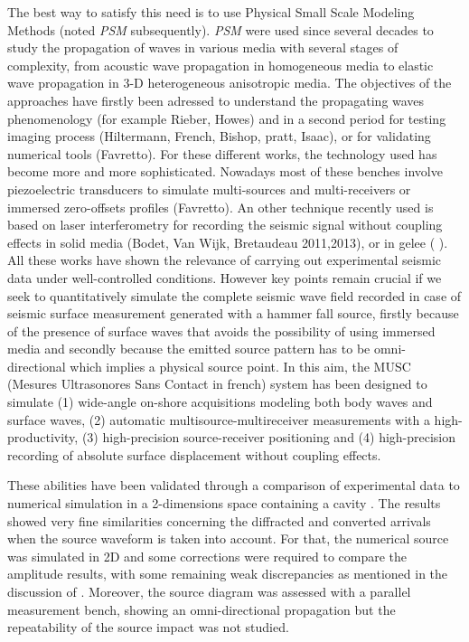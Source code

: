 \documentclass[manuscript,revised]{geophysics}
\newcommand{\psm}{\textit{PSM} }
\newcommand{\thrd}{3-D }
\begin{document}
\noindent The best way to satisfy this need is to use Physical Small Scale Modeling Methods (noted \psm subsequently). \psm were used since several decades to study the propagation of waves in various media with several stages of complexity, from acoustic wave propagation in homogeneous media to elastic wave propagation in \thrd heterogeneous anisotropic media. The objectives of the approaches have firstly been adressed to understand the propagating waves phenomenology (for example  Rieber, Howes) and in a second period for testing imaging process (Hiltermann, French, Bishop, pratt, Isaac), or for validating numerical tools (Favretto). For these different works, the technology used has become more and more sophisticated. Nowadays most of these benches involve piezoelectric transducers to simulate multi-sources and multi-receivers \citep{Wong_SPM_2009} or immersed zero-offsets profiles (Favretto). An other technique recently used is based on laser interferometry for recording the seismic signal without coupling effects in solid media (Bodet, Van Wijk, Bretaudeau 2011,2013), or in gelee ( ). All these works have shown the relevance of carrying out experimental seismic data under well-controlled conditions. However key points remain crucial if we seek to quantitatively simulate the complete seismic wave field recorded in case of seismic surface measurement generated with a hammer fall source, firstly because of the presence of surface waves that avoids the possibility of using immersed media and secondly because the emitted source pattern has to be omni-directional which implies a physical source point. In this aim, the MUSC (Mesures Ultrasonores Sans Contact in french) system has been designed  \citep{Bretaudeau_SSM_2011} to simulate (1) wide-angle on-shore acquisitions modeling both body waves and surface waves, (2) automatic multisource-multireceiver measurements with a high-productivity, (3) high-precision source-receiver positioning and (4) high-precision recording of absolute surface displacement without coupling effects. 

\noindent These abilities have been validated through a comparison of experimental data to numerical simulation in a 2-dimensions space containing a cavity \citep{Bretaudeau_SSM_2011}. The results showed very fine similarities concerning the diffracted and converted arrivals when the source waveform is taken into account. For that, the numerical source was simulated in 2D and some corrections were required to compare the amplitude results, with some remaining weak discrepancies as mentioned in the discussion of \citet{Bretaudeau_SSM_2011}. Moreover, the source diagram was assessed with a parallel measurement bench, showing an omni-directional propagation but the repeatability of the source impact was not studied.
\end{document}
